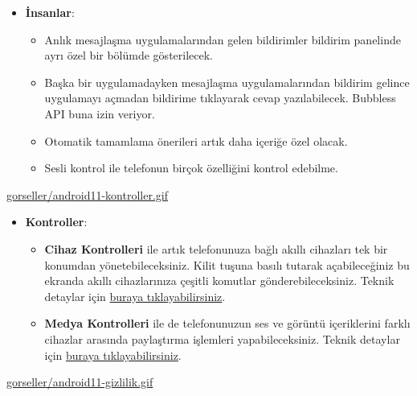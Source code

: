\documentclass[11pt]{article}
\begin{document}
\begin{itemize}
\item \textbf{İnsanlar}:
\begin{itemize}
\item Anlık mesajlaşma uygulamalarından gelen bildirimler bildirim panelinde
ayrı özel bir bölümde gösterilecek.
\item Başka bir uygulamadayken mesajlaşma uygulamalarından bildirim gelince
uygulamayı açmadan bildirime tıklayarak cevap yazılabilecek. Bubbless API
buna izin veriyor.
\item Otomatik tamamlama önerileri artık daha içeriğe özel olacak.
\item Sesli kontrol ile telefonun birçok özelliğini kontrol edebilme.
\end{itemize}
\end{itemize}

\url{gorseller/android11-kontroller.gif}

\begin{itemize}
\item \textbf{Kontroller}:
\begin{itemize}
\item \textbf{Cihaz Kontrolleri} ile artık telefonunuza bağlı akıllı cihazları tek bir
konumdan yönetebileceksiniz. Kilit tuşuna basılı tutarak açabileceğiniz
bu ekranda akıllı cihazlarınıza çeşitli komutlar gönderebileceksiniz.
Teknik detaylar için \href{https://developer.android.com/preview/features/device-control}{buraya tıklayabilirsiniz}.
\item \textbf{Medya Kontrolleri} ile de telefonunuzun ses ve görüntü içeriklerini
farklı cihazlar arasında paylaştırma işlemleri yapabileceksiniz. Teknik
detaylar için \href{https://developer.android.com/preview/features/media-controls}{buraya tıklayabilirsiniz}.
\end{itemize}
\end{itemize}

\url{gorseller/android11-gizlilik.gif}
\end{document}
